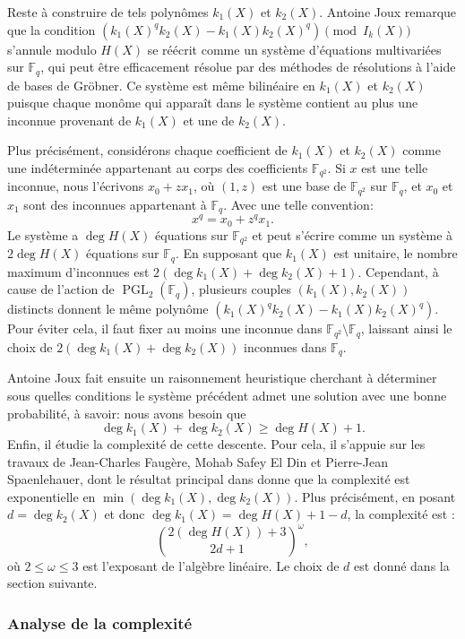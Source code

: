 \documentclass[a4paper, titlepage, 11pt]{article}
\theoremstyle{definition}
\theoremstyle{remark}
\def\gf #1{\mathbb{F}_{#1}}
\begin{document}
Reste à construire de tels polynômes $k_1(X)$ et $k_2(X)$. Antoine Joux \cite{joux2013} remarque que la condition $(k_1(X)^qk_2(X)-k_1(X)k_2(X)^q) \pmod{I_k(X)}$ s'annule modulo $H(X)$ se réécrit comme un système d'équations multivariées sur $\gf{q}$, qui peut être efficacement résolue par des méthodes de résolutions à l'aide de bases de Gröbner.
Ce système est même bilinéaire en $k_1(X)$ et $k_2(X)$ puisque chaque monôme qui apparaît dans le système contient au plus une inconnue provenant de $k_1(X)$ et une de $k_2(X)$.

Plus précisément, considérons chaque coefficient de $k_1(X)$ et $k_2(X)$ comme une indéterminée appartenant au corps des coefficients $\gf{q^2}$. Si $x$ est une telle inconnue, nous l'écrivons $x_0 + zx_1$, où $(1,z)$ est une base de $\gf{q^2}$ sur $\gf{q}$, et $x_0$ et $x_1$ sont des inconnues appartenant à $\gf{q}$. Avec une telle convention: $$x^q = x_0 + z^qx_1.$$
Le système a $\deg H(X)$ équations sur $\gf{q^2}$ et peut s'écrire comme un système à $2\deg H(X)$ équations sur $\gf{q}$. En supposant que $k_1(X)$ est unitaire, le nombre maximum d'inconnues est $2(\deg k_1(X) + \deg k_2(X) + 1)$. Cependant, à cause de l'action de $\operatorname{PGL}_2(\gf{q})$, plusieurs couples $(k_1(X),k_2(X))$ distincts donnent le même polynôme $(k_1(X)^qk_2(X)-k_1(X)k_2(X)^q)$. Pour éviter cela, il faut fixer au moins une inconnue dans $\gf{q^2} \setminus \gf{q}$, laissant ainsi le choix de $2(\deg k_1(X) + \deg k_2(X))$ inconnues dans $\gf{q}$.

Antoine Joux \cite{joux2013} fait ensuite un raisonnement heuristique cherchant à déterminer sous quelles conditions le système précédent admet une solution avec une bonne probabilité, à savoir: nous avons besoin que
$$\deg k_1(X) + \deg k_2(X) \geqslant \deg H(X) + 1.$$
Enfin, il étudie la complexité de cette descente. Pour cela, il s'appuie sur les travaux de Jean-Charles Faugère, Mohab Safey El Din et Pierre-Jean Spaenlehauer, dont le résultat principal dans \cite{faugere2011, spaenlehauer2012} donne que la complexité est exponentielle en $\min(\deg k_1(X), \deg k_2 (X))$.
Plus précisément, en posant $d = \deg k_2(X)$ et donc $\deg k_1(X) = \deg H(X) +1 - d$, la complexité est :
$$\binom{2 (\deg H(X)) + 3}{2d+1}^\omega,$$
où $2 \leqslant \omega \leqslant 3$ est l'exposant de l'algèbre linéaire.
Le choix de $d$ est donné dans la section suivante.

\subsubsection{Analyse de la complexité}
\end{document}
